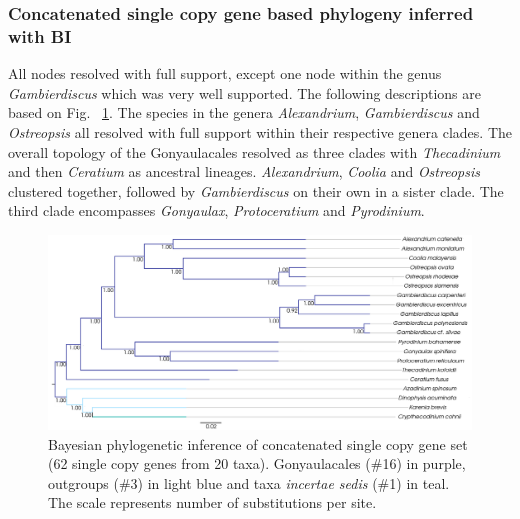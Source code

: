 \documentclass[12pt]{article}
\begin{document}
\subsubsection*{Concatenated single copy gene based phylogeny inferred with BI}
\FloatBarrier 
All nodes resolved with full support, except one node within the genus \textit{Gambierdiscus} which was very well supported. 
The following descriptions are based on Fig. ~\ref{fig:SCconcatBI}. 
The species in the genera \textit{Alexandrium}, \textit{Gambierdiscus} and \textit{Ostreopsis} all resolved with full support within their respective genera clades. 
The overall topology of the Gonyaulacales resolved as three clades with \textit{Thecadinium} and then \textit{Ceratium} as ancestral lineages. 
\textit{Alexandrium}, \textit{Coolia} and \textit{Ostreopsis} clustered together, followed by \textit{Gambierdiscus} on their own in a sister clade. 
The third clade encompasses \textit{Gonyaulax}, \textit{Protoceratium} and \textit{Pyrodinium}. 

\begin{figure} 
\includegraphics[scale=.3]{figures/SC-concat-BI.png} 
\caption{Bayesian phylogenetic inference of concatenated single copy gene set (62 single copy genes from 20 taxa). Gonyaulacales (\#16) in purple, outgroups (\#3) in light blue and taxa \textit{incertae sedis} (\#1) in teal. The scale represents number of substitutions per site.} 
\label{fig:SCconcatBI}
\end{figure} 
\FloatBarrier
\end{document}
